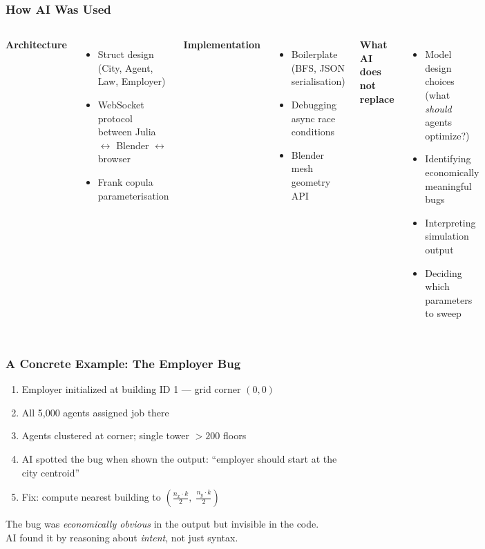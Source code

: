 \documentclass{beamer}
\begin{document}
\begin{frame}
  \frametitle{How AI Was Used}
  \begin{columns}
    \textcolor{nimbygreen}{\textbf{Architecture}}
    \begin{itemize}
      \small
      \item Struct design (City, Agent, Law, Employer)
      \item WebSocket protocol between Julia $\leftrightarrow$ Blender $\leftrightarrow$ browser
      \item Frank copula parameterisation
    \end{itemize}
    \vspace{0.5em}
    \textcolor{nimbyblue}{\textbf{Implementation}}
    \begin{itemize}
      \small
      \item Boilerplate (BFS, JSON serialisation)
      \item Debugging async race conditions
      \item Blender mesh geometry API
    \end{itemize}
    \textcolor{nimbyyellow}{\textbf{What AI does not replace}}
    \begin{itemize}
      \small
      \item Model design choices (what \emph{should} agents optimize?)
      \item Identifying economically meaningful bugs
      \item Interpreting simulation output
      \item Deciding which parameters to sweep
    \end{itemize}
  \end{columns}
\end{frame}

\begin{frame}
  \frametitle{A Concrete Example: The Employer Bug}
  \begin{enumerate}
    \item Employer initialized at building ID 1 — grid corner $(0,0)$
    \item All 5,000 agents assigned job there
    \item Agents clustered at corner; single tower $>200$ floors
    \item AI spotted the bug when shown the output: \textcolor{nimbyyellow}{``employer should start at the city centroid''}
    \item Fix: compute nearest building to $\left(\frac{n_x \cdot k}{2},\; \frac{n_y \cdot k}{2}\right)$
  \end{enumerate}
  \vspace{0.5em}
  \small The bug was \emph{economically obvious} in the output but invisible in the code.\\
  AI found it by reasoning about \emph{intent}, not just syntax.
\end{frame}
\end{document}
